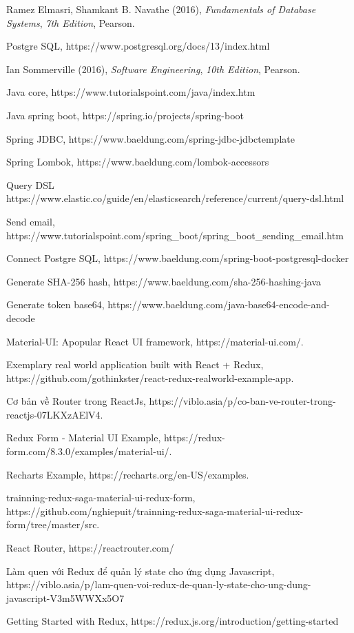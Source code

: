 \documentclass[a4paper,12pt,fleqn,print,oneside]{extarticle}
\begin{document}
	
\newpage
{}
\begin{thebibliography}{80}

 Ramez Elmasri, Shamkant B. Navathe (2016), \textit{Fundamentals of Database Systems}, \textit{7th Edition}, Pearson.

 Postgre SQL, https://www.postgresql.org/docs/13/index.html

 Ian Sommerville (2016), \textit{Software Engineering}, \textit{10th Edition}, Pearson.

 Java core, https://www.tutorialspoint.com/java/index.htm

 Java spring boot, https://spring.io/projects/spring-boot

 Spring JDBC, https://www.baeldung.com/spring-jdbc-jdbctemplate

 Spring Lombok, https://www.baeldung.com/lombok-accessors

 Query DSL https://www.elastic.co/guide/en/elasticsearch/reference/current/query-dsl.html

 Send email, https://www.tutorialspoint.com/spring\_boot/spring\_boot\_sending\_email.htm

 Connect Postgre SQL, https://www.baeldung.com/spring-boot-postgresql-docker

 Generate SHA-256 hash, https://www.baeldung.com/sha-256-hashing-java

 Generate token base64, https://www.baeldung.com/java-base64-encode-and-decode

\bibitem{} Material-UI: Apopular React UI framework, https://material-ui.com/. 

\bibitem{} Exemplary real world application built with React + Redux, https://github.com/gothinkster/react-redux-realworld-example-app. 

\bibitem{} Cơ bản về Router trong ReactJs, https://viblo.asia/p/co-ban-ve-router-trong-reactjs-07LKXzAElV4. 

\bibitem{} Redux Form - Material UI Example, https://redux-form.com/8.3.0/examples/material-ui/.

\bibitem{} Recharts Example, https://recharts.org/en-US/examples.

\bibitem{} trainning-redux-saga-material-ui-redux-form, https://github.com/nghiepuit/trainning-redux-saga-material-ui-redux-form/tree/master/src.

\bibitem{} React Router, https://reactrouter.com/

\bibitem{} Làm quen với Redux để quản lý state cho ứng dụng Javascript, https://viblo.asia/p/lam-quen-voi-redux-de-quan-ly-state-cho-ung-dung-javascript-V3m5WWXx5O7

\bibitem{} Getting Started with Redux, https://redux.js.org/introduction/getting-started



\end{thebibliography}
\end{document}
